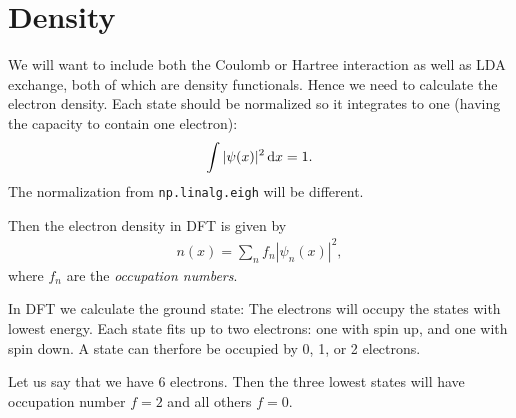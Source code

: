 \documentclass{article}
\begin{document}

\section*{Density}
We will want to include both the Coulomb or Hartree interaction
as well as LDA exchange, both of which are density functionals.
Hence we need to calculate the electron density.
Each state should be normalized so it integrates to one (having the
capacity to contain one electron):
\begin{align}
  \int |\psi(x)|^2 \,\mathrm d x = 1.
\end{align}
The normalization from \texttt{np.linalg.eigh} will be different.


Then the electron density in DFT is given by
\begin{align}
  n(x) = \sum_n f_n |\psi_n(x)|^2,
\end{align}
where $f_n$ are the \emph{occupation numbers}.

In DFT we calculate the ground state: The electrons will
occupy the states with lowest energy.  Each
state fits up to two electrons: one with spin up, and one with spin down.
A state can therfore be occupied by 0, 1, or 2 electrons.

Let us say that we have 6 electrons.  Then the three lowest states
will have occupation number $f=2$ and all others $f=0$.

\end{document}
